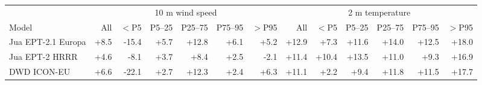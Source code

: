 \begin{tabular}{lrrrrrrrrrrrr}
\toprule
& \multicolumn{6}{c}{10 m wind speed} & \multicolumn{6}{c}{2 m temperature} \\
\cmidrule(lr){2-7} \cmidrule(lr){8-13}
Model & All & $<$P5 & P5--25 & P25--75 & P75--95 & $>$P95 & All & $<$P5 & P5--25 & P25--75 & P75--95 & $>$P95 \\
\midrule
Jua EPT-2.1 Europa & +8.5 & -15.4 & +5.7 & +12.8 & +6.1 & +5.2 & +12.9 & +7.3 & +11.6 & +14.0 & +12.5 & +18.0 \\
Jua EPT-2 HRRR & +4.6 & -8.1 & +3.7 & +8.4 & +2.5 & -2.1 & +11.4 & +10.4 & +13.5 & +11.0 & +9.3 & +16.9 \\
DWD ICON-EU & +6.6 & -22.1 & +2.7 & +12.3 & +2.4 & +6.3 & +11.1 & +2.2 & +9.4 & +11.8 & +11.5 & +17.7 \\
\bottomrule
\end{tabular}

